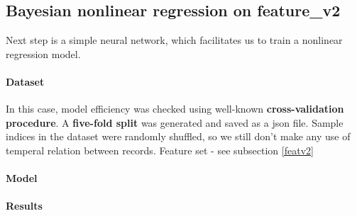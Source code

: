 \documentclass[12pt,twoside,a4paper]{memoir}
\begin{document}
\subsection{Bayesian nonlinear regression on feature\_v2}
Next step is a simple neural network, which facilitates us to train a nonlinear regression model. 

\paragraph{Dataset}
In this case, model efficiency was checked using well-known \textbf{cross-validation procedure}. A \textbf{five-fold split} was generated and saved as a json file. Sample indices in the dataset were randomly shuffled, so we still don't make any use of temperal relation between records. Feature set - see subsection \ref{featv2}

\paragraph{Model}

\paragraph{Results}







\printbibliography
\end{document}
